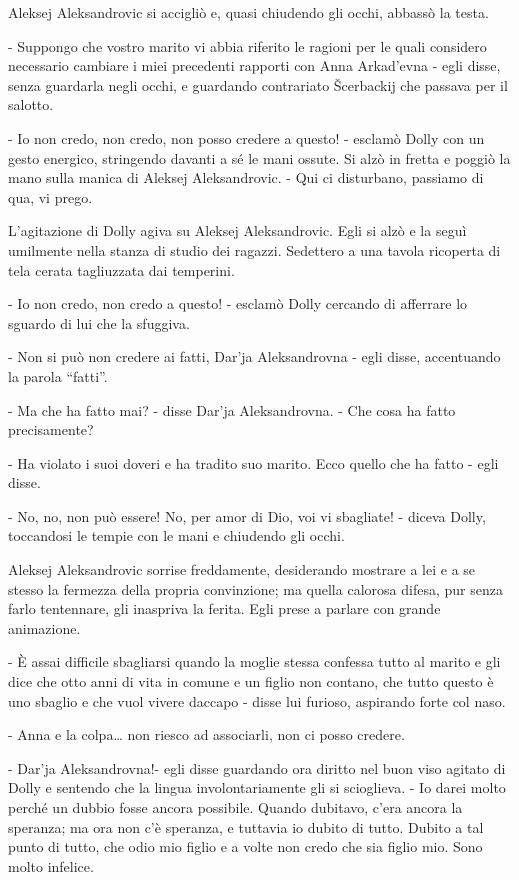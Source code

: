 Aleksej Aleksandrovic si accigliò e, quasi chiudendo gli occhi, abbassò la testa. 

- Suppongo che vostro marito vi abbia riferito le ragioni per le quali considero necessario cambiare i miei precedenti rapporti con Anna Arkad'evna - egli disse, senza guardarla negli occhi, e guardando contrariato Šcerbackij che passava per il salotto. 

- Io non credo, non credo, non posso credere a questo! - esclamò Dolly con un gesto energico, stringendo davanti a sé le mani ossute. Si alzò in fretta e poggiò la mano sulla manica di Aleksej Aleksandrovic. - Qui ci disturbano, passiamo di qua, vi prego. 

L'agitazione di Dolly agiva su Aleksej Aleksandrovic. Egli si alzò e la seguì umilmente nella stanza di studio dei ragazzi. Sedettero a una tavola ricoperta di tela cerata tagliuzzata dai temperini. 

- Io non credo, non credo a questo! - esclamò Dolly cercando di afferrare lo sguardo di lui che la sfuggiva. 

- Non si può non credere ai fatti, Dar'ja Aleksandrovna - egli disse, accentuando la parola ``fatti''. 

- Ma che ha fatto mai? - disse Dar'ja Aleksandrovna. - Che cosa ha fatto precisamente? 

- Ha violato i suoi doveri e ha tradito suo marito. Ecco quello che ha fatto - egli disse. 

- No, no, non può essere! No, per amor di Dio, voi vi sbagliate! - diceva Dolly, toccandosi le tempie con le mani e chiudendo gli occhi. 

Aleksej Aleksandrovic sorrise freddamente, desiderando mostrare a lei e a se stesso la fermezza della propria convinzione; ma quella calorosa difesa, pur senza farlo tentennare, gli inaspriva la ferita. Egli prese a parlare con grande animazione. 

- È assai difficile sbagliarsi quando la moglie stessa confessa tutto al marito e gli dice che otto anni di vita in comune e un figlio non contano, che tutto questo è uno sbaglio e che vuol vivere daccapo - disse lui furioso, aspirando forte col naso. 

- Anna e la colpa\ldots{} non riesco ad associarli, non ci posso credere. 

- Dar'ja Aleksandrovna!- egli disse guardando ora diritto nel buon viso agitato di Dolly e sentendo che la lingua involontariamente gli si scioglieva. - Io darei molto perché un dubbio fosse ancora possibile. Quando dubitavo, c'era ancora la speranza; ma ora non c'è speranza, e tuttavia io dubito di tutto. Dubito a tal punto di tutto, che odio mio figlio e a volte non credo che sia figlio mio. Sono molto infelice. 

